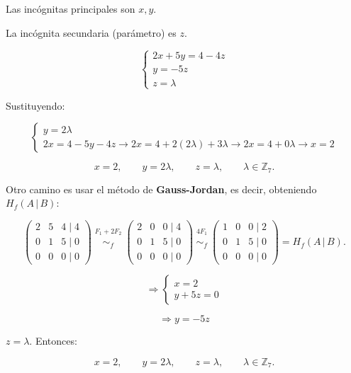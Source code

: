 \documentclass[a4paper,12pt]{article}
\begin{document}
\begin{ejemplo}[title=Resolución de un sistema lineal sobre $\mathbb{Z}_7$]
Las incógnitas principales son \(x,y\).

La incógnita secundaria (parámetro) es \(z\).

\[
\begin{cases}
2x + 5y = 4 - 4z \\
y = -5 z \\
z = \lambda
\end{cases}
\]

Sustituyendo:

\[
\begin{cases}
y = 2 \lambda \\
2x = 4 -5y -4z \to 2x = 4 + 2(2\lambda) + 3 \lambda \to 2x = 4 + 0 \lambda \to x = 2
\end{cases}
\]

\[
\boxed{
x = 2,\qquad y = 2\lambda,\qquad z = \lambda,\qquad \lambda \in \mathbb{Z}_7.
}
\]

\end{ejemplo}

\begin{ejemplo}[title=Resolución de un sistema lineal sobre $\mathbb{Z}_7$]
Otro camino es usar el método de \textbf{Gauss-Jordan}, es decir, obteniendo $H_f(A\,|\,B)$:

\[
\begin{pmatrix}
2 & 5 & 4 \;\Big|\; 4 \\
0 & 1 & 5 \;\Big|\; 0 \\
0 & 0 & 0 \;\Big|\; 0
\end{pmatrix}
\overset{\substack{F_1 + 2 F_2 \\{}}}{\sim_f}
\begin{pmatrix}
2 & 0 & 0 \;\Big|\; 4 \\
0 & 1 & 5 \;\Big|\; 0 \\
0 & 0 & 0 \;\Big|\; 0
\end{pmatrix}
\overset{\substack{4 F_1 \\{}}}{\sim_f}
\begin{pmatrix}
1 & 0 & 0 \;\Big|\; 2 \\
0 & 1 & 5 \;\Big|\; 0 \\
0 & 0 & 0 \;\Big|\; 0
\end{pmatrix}
= H_f(A\,|\,B).
\]

\[
\Rightarrow
\begin{cases}
x = 2 \\
y + 5 z = 0
\end{cases}
\]

\[
\Rightarrow y = -5 z
\]

\(z = \lambda\). Entonces:

\[
\boxed{
x = 2,\qquad y = 2 \lambda,\qquad z = \lambda,\qquad \lambda \in \mathbb{Z}_7.
}
\]

\end{ejemplo}
\end{document}
